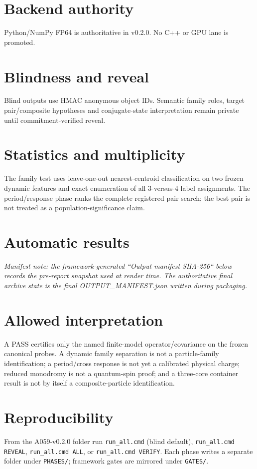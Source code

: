 \documentclass[11pt]{article}
\begin{document}
\section{Backend authority}
Python/NumPy FP64 is authoritative in v0.2.0. No C++ or GPU lane is promoted.

\section{Blindness and reveal}
Blind outputs use HMAC anonymous object IDs. Semantic family roles, target pair/composite hypotheses and conjugate-state interpretation remain private until commitment-verified reveal.

\section{Statistics and multiplicity}
The family test uses leave-one-out nearest-centroid classification on two frozen dynamic features and exact enumeration of all 3-versus-4 label assignments. The period/response phase ranks the complete registered pair search; the best pair is not treated as a population-significance claim.

\section{Automatic results}
{\small
\textit{Manifest note: the framework-generated ``Output manifest SHA-256`` below records the pre-report snapshot used at render time. The authoritative final archive state is the final OUTPUT\_MANIFEST.json written during packaging.}\par
{}
}

\section{Allowed interpretation}
A PASS certifies only the named finite-model operator/covariance on the frozen canonical probes. A dynamic family separation is not a particle-family identification; a period/cross response is not yet a calibrated physical charge; reduced monodromy is not a quantum-spin proof; and a three-core container result is not by itself a composite-particle identification.

\section{Reproducibility}
From the A059-v0.2.0 folder run \texttt{run\_all.cmd} (blind default), \texttt{run\_all.cmd REVEAL}, \texttt{run\_all.cmd ALL}, or \texttt{run\_all.cmd VERIFY}. Each phase writes a separate folder under \texttt{PHASES/}; framework gates are mirrored under \texttt{GATES/}.
\end{document}
